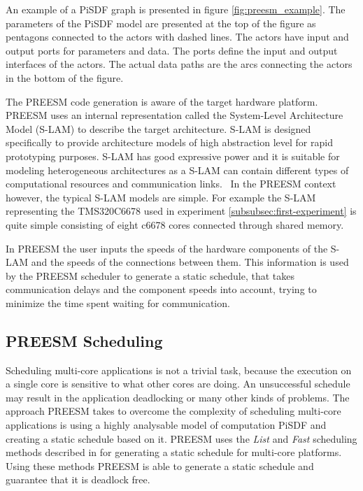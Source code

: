 An example of a PiSDF graph is presented in figure \ref{fig:preesm_example}. The parameters of the PiSDF model are presented at the top of the figure as pentagons connected to the actors with dashed lines. The actors have input and output ports for parameters and data. The ports define the input and output interfaces of the actors. The actual data paths are the arcs connecting the actors in the bottom of the figure.

The PREESM code generation is aware of the target hardware platform. PREESM uses an internal representation called the System-Level Architecture Model (S-LAM) \cite{pelcat2009system} to describe the target architecture. S-LAM is designed specifically to provide architecture models of high abstraction level for rapid prototyping purposes. S-LAM has good expressive power and it is suitable for modeling heterogeneous architectures as a S-LAM can contain different types of computational resources and communication links.~\cite{pelcat2009system} In the PREESM context however, the typical S-LAM models are simple. For example the S-LAM representing the TMS320C6678 used in experiment \ref{subsubsec:first-experiment} is quite simple consisting of eight c6678 cores connected through shared memory.

In PREESM the user inputs the speeds of the hardware components of the S-LAM and the speeds of the connections between them. This information is used by the PREESM scheduler to generate a static schedule, that takes communication delays and the component speeds into account, trying to minimize the time spent waiting for communication.~\cite{pelcat2009system}

\subsection{PREESM Scheduling}
\label{sec:preesm-scheduling}
Scheduling multi-core applications is not a trivial task, because the execution on a single core is sensitive to what other cores are doing. An unsuccessful schedule may result in the application deadlocking or many other kinds of problems. The approach PREESM takes to overcome the complexity of scheduling multi-core applications is using a highly analysable model of computation PiSDF and creating a static schedule based on it. PREESM uses the \textit{List} and \textit{Fast} scheduling methods described in \cite{kwok1997high} for generating a static schedule for multi-core platforms. Using these methods PREESM is able to generate a static schedule and guarantee that it is deadlock free.

